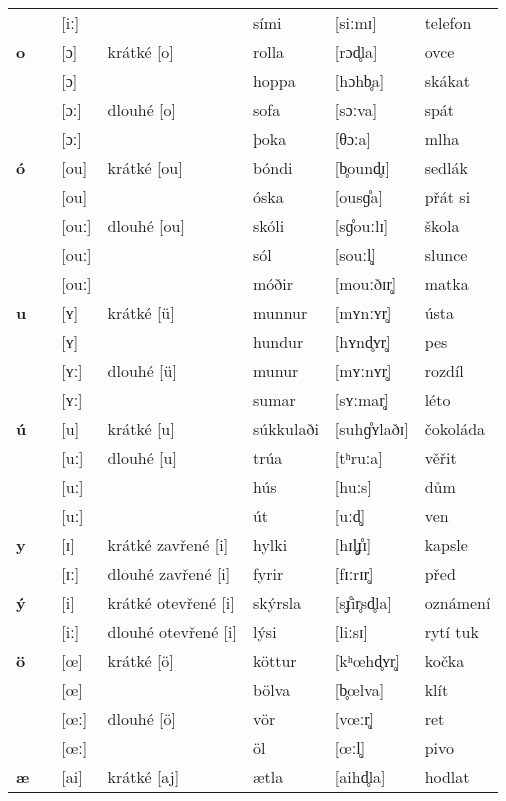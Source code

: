 \begin{longtable}{>{\bfseries}lX>{\IPAFont}lXl>{\IPAFont}ll}
 &  & {[iː]} &  & sími & {[siːmɪ]} & telefon \\ 
o &  & {[ɔ]} & krátké [o] & rolla & {[rɔd̥la]} & ovce \\ 
 &  & {[ɔ]} &  & hoppa & {[hɔhb̥a]} & skákat \\ 
 &  & {[ɔː]} & dlouhé [o] & sofa & {[sɔːva]} & spát \\ 
 &  & {[ɔː]} &  & þoka & {[θɔːa]} & mlha \\ 
ó &  & {[ou]} & krátké [ou] & bóndi & {[b̥ound̥ɪ]} & sedlák \\ 
 &  & {[ou]} &  & óska & {[ousɡ̊a]} & přát si \\ 
 &  & {[ouː]} & dlouhé [ou] & skóli & {[sɡ̊ouːlɪ]} & škola \\ 
 &  & {[ouː]} &  & sól & {[souːl̥]} & slunce \\ 
 &  & {[ouː]} &  & móðir & {[mouːðɪr̥]} & matka \\ 
u &  & {[ʏ]} & krátké [ü] & munnur & {[mʏnːʏr̥]} & ústa \\ 
 &  & {[ʏ]} &  & hundur & {[hʏnd̥ʏr̥]} & pes \\ 
 &  & {[ʏː]} & dlouhé [ü] & munur & {[mʏːnʏr̥]} & rozdíl \\ 
 &  & {[ʏː]} &  & sumar & {[sʏːmar̥]} & léto \\ 
ú &  & {[u]} & krátké [u] & súkkulaði & {[suhɡ̊ʏlaðɪ]} & čokoláda \\ 
 &  & {[uː]} & dlouhé [u] & trúa & {[tʰruːa]} & věřit \\ 
 &  & {[uː]} &  & hús & {[huːs]} & dům \\ 
 &  & {[uː]} &  & út & {[uːd̥]} & ven \\ 
y &  & {[ɪ]} & krátké zavřené [i] & hylki & {[hɪl̥\r ɟɪ]} & kapsle \\ 
 &  & {[ɪː]} & dlouhé zavřené [i] & fyrir & {[fɪːrɪr̥]} & před \\ 
ý &  & {[i]} & krátké otevřené [i] & skýrsla & {[s\r ɟir̥sd̥la]} & oznámení \\ 
 &  & {[iː]} & dlouhé otevřené [i] & lýsi & {[liːsɪ]} & rytí tuk \\ 
ö &  & {[\oe]} & krátké [ö] & köttur & {[kʰ\oe hd̥ʏr̥]} & kočka \\ 
 &  & {[\oe]} &  & bölva & {[b̥\oe lva]} & klít \\ 
 &  & {[\oe ː]} & dlouhé [ö] & vör & {[v\oe ːr̥]} & ret \\ 
 &  & {[\oe ː]} &  & öl & {[\oe ːl̥]} & pivo \\ 
æ &  & {[ai]} & krátké [aj] & ætla & {[aihd̥la]} & hodlat \\ 

\end{longtable}

